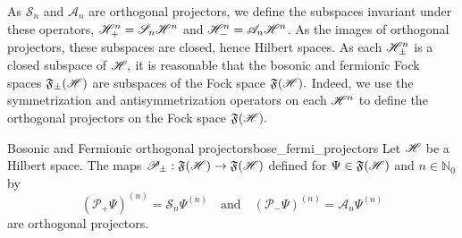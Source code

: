 As \(\mathscr{S}_n\) and \(\mathscr{A}_n\) are orthogonal projectors, we define the subspaces invariant under these operators, \(\mathscr{H}^n_+ = \mathscr{S}_n \mathscr{H}^n\) and \(\mathscr{H}^n_- = \mathscr{A}_n \mathscr{H}^n\). As the images of orthogonal projectors, these subspaces are closed, hence Hilbert spaces.
As each \(\mathscr{H}^n_\pm\) is a closed subspace of \(\mathscr{H},\) it is reasonable that the bosonic and fermionic Fock spaces \(\mathfrak{F}_\pm(\mathscr{H})\) are subspaces of the Fock space \(\mathfrak{F}(\mathscr{H}).\) Indeed, we use the symmetrization and antisymmetrization operators on each \(\mathscr{H}^n\) to define the orthogonal projectors on the Fock space \(\mathfrak{F}(\mathscr{H}).\)
\begin{proposition}{Bosonic and Fermionic orthogonal projectors}{bose_fermi_projectors}
    Let \(\mathscr{H}\) be a Hilbert space. The maps \(\mathscr{P}_\pm : \mathfrak{F}(\mathscr{H}) \to \mathfrak{F}(\mathscr{H})\) defined for \(\Psi \in \mathfrak{F}(\mathscr{H})\) and \(n \in \mathbb{N}_0\) by
    \begin{equation*}
        \left(\mathscr{P}_+ \Psi\right)^{(n)} = \mathscr{S}_n \Psi^{(n)}
        \quad\text{and}\quad
        \left(\mathscr{P}_- \Psi\right)^{(n)} = \mathscr{A}_n \Psi^{(n)}
    \end{equation*}
    are orthogonal projectors.
\end{proposition}
